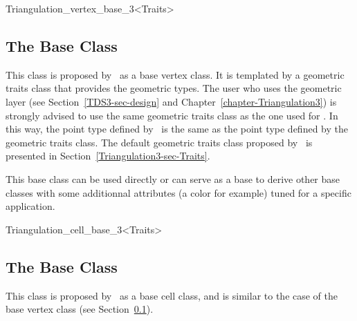 	\begin{ccClassTemplate}{Triangulation_vertex_base_3<Traits>}
	\subsection{The Base Class \protect \ccClassTemplateName}
	\label{TDS3-sec-class-Base_Vertex}

This class is proposed by \cgal\ as a base vertex class. It is
templated by a geometric traits class  that provides the
geometric types. The user who uses the geometric layer (see
Section~\ref{TDS3-sec-design} and
Chapter~\ref{chapter-Triangulation3}) is strongly advised to use the
same geometric traits class  as the one used for
. In this way, the point type
defined by \ccClassName\ is the same as the point type defined by the
geometric traits class. The default geometric traits class proposed by 
\cgal\ is presented in Section~\ref{Triangulation3-sec-Traits}.

This base class can be used directly or can serve as a base to derive
other base classes with some additionnal attributes (a color for
example) tuned for a specific application.


	\end{ccClassTemplate} 

	\begin{ccClassTemplate}{Triangulation_cell_base_3<Traits>}
	\subsection{The Base Class \protect \ccClassTemplateName}

This class is proposed by \cgal\ as a base cell class, and is similar
to the case of the base vertex class (see
Section~\ref{TDS3-sec-class-Base_Vertex}).


	\end{ccClassTemplate} 
